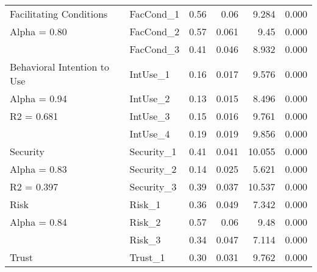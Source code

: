 \begin{table}
{\begin{tabular}{llrrrl}
Facilitating Conditions     & FacCond\_1  & 0.56                      & 0.06                         & 9.284                       & 0.000   \\
Alpha = 0.80                & FacCond\_2  & 0.57                      & 0.061                        & 9.45                        & 0.000   \\
                            & FacCond\_3  & 0.41                      & 0.046                        & 8.932                       & 0.000   \\ \hline
Behavioral Intention to Use & IntUse\_1   & 0.16                      & 0.017                        & 9.576                       & 0.000   \\
Alpha = 0.94                & IntUse\_2   & 0.13                      & 0.015                        & 8.496                       & 0.000   \\
R2 = 0.681                  & IntUse\_3   & 0.15                      & 0.016                        & 9.761                       & 0.000   \\
                            & IntUse\_4   & 0.19                      & 0.019                        & 9.856                       & 0.000   \\ \hline
Security                    & Security\_1 & 0.41                      & 0.041                        & 10.055                      & 0.000   \\
Alpha = 0.83                & Security\_2 & 0.14                      & 0.025                        & 5.621                       & 0.000   \\
R2 = 0.397                  & Security\_3 & 0.39                      & 0.037                        & 10.537                      & 0.000   \\ \hline
Risk                        & Risk\_1  & 0.36                         & 0.049                        & 7.342                       & 0.000   \\
Alpha = 0.84                & Risk\_2  & 0.57                         & 0.06                         & 9.48                        & 0.000   \\
                            & Risk\_3  & 0.34                         & 0.047                        & 7.114                       & 0.000   \\ \hline
Trust                       & Trust\_1    & 0.30                      & 0.031                        & 9.762                       & 0.000   \\

\end{tabular}}
\end{table}
